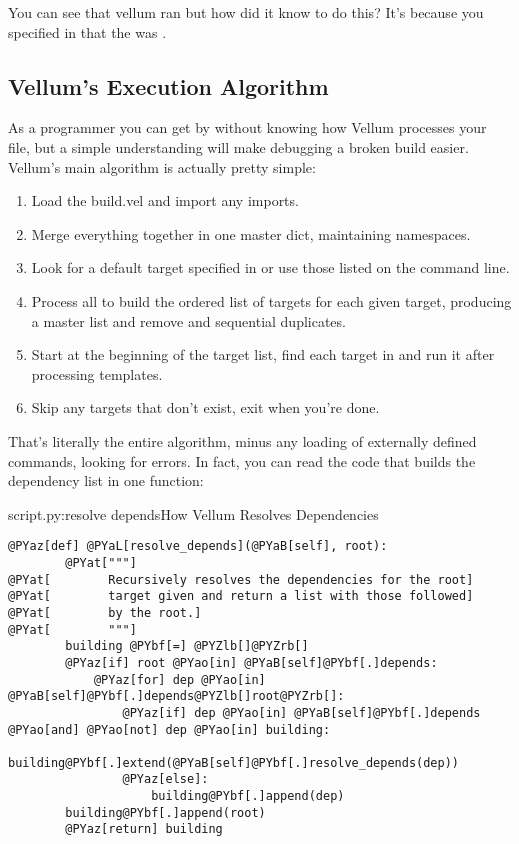 You can see that vellum ran  but how did it know to do
this?  It's because you specified in  that the 
was .



\subsection{Vellum's Execution Algorithm}

As a programmer you can get by without knowing how Vellum processes your file,
but a simple understanding will make debugging a broken build easier.   Vellum's
main algorithm is actually pretty simple:

\begin{enumerate}
\item Load the build.vel and import any imports.
\item Merge everything together in one master dict, maintaining namespaces.
\item Look for a default target specified in  or use those listed
    on the command line.
\item Process all  to build the ordered list of targets for each
given target, producing a master list and remove and sequential duplicates.
\item Start at the beginning of the target list, find each target in
     and run it after processing templates.
\item Skip any targets that don't exist, exit when you're done.
\end{enumerate}

That's literally the entire algorithm, minus any loading of externally defined
commands, looking for errors.  In fact, you can read the code that builds the
dependency list in one function:

\begin{code}{script.py:resolve depends}{How Vellum Resolves Dependencies}
\begin{Verbatim}[commandchars=@\[\]]
    @PYaz[def] @PYaL[resolve_depends](@PYaB[self], root):
        @PYat["""]
@PYat[        Recursively resolves the dependencies for the root]
@PYat[        target given and return a list with those followed]
@PYat[        by the root.]
@PYat[        """]
        building @PYbf[=] @PYZlb[]@PYZrb[]
        @PYaz[if] root @PYao[in] @PYaB[self]@PYbf[.]depends:
            @PYaz[for] dep @PYao[in] @PYaB[self]@PYbf[.]depends@PYZlb[]root@PYZrb[]:
                @PYaz[if] dep @PYao[in] @PYaB[self]@PYbf[.]depends @PYao[and] @PYao[not] dep @PYao[in] building:
                    building@PYbf[.]extend(@PYaB[self]@PYbf[.]resolve_depends(dep))
                @PYaz[else]:
                    building@PYbf[.]append(dep)
        building@PYbf[.]append(root)
        @PYaz[return] building
\end{Verbatim}

\end{code}


